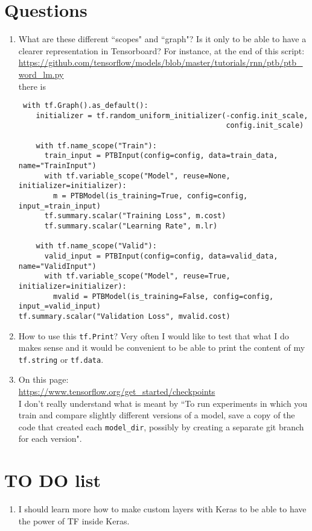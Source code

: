 \documentclass[11pt,a4paper]{article}
\begin{document}
\section{Questions}
\begin{enumerate}
\item What are these different ``scopes" and ``graph"? Is it only to be able to have a clearer representation in Tensorboard? For instance, at the end of this script:\\
\url{https://github.com/tensorflow/models/blob/master/tutorials/rnn/ptb/ptb_word_lm.py}\\
there is\\
\begin{verbatim}
 with tf.Graph().as_default():
    initializer = tf.random_uniform_initializer(-config.init_scale,
                                                config.init_scale)

    with tf.name_scope("Train"):
      train_input = PTBInput(config=config, data=train_data, name="TrainInput")
      with tf.variable_scope("Model", reuse=None, initializer=initializer):
        m = PTBModel(is_training=True, config=config, input_=train_input)
      tf.summary.scalar("Training Loss", m.cost)
      tf.summary.scalar("Learning Rate", m.lr)

    with tf.name_scope("Valid"):
      valid_input = PTBInput(config=config, data=valid_data, name="ValidInput")
      with tf.variable_scope("Model", reuse=True, initializer=initializer):
        mvalid = PTBModel(is_training=False, config=config, input_=valid_input)
tf.summary.scalar("Validation Loss", mvalid.cost)
\end{verbatim}
\item How to use this \texttt{tf.Print}? Very often I would like to test that what I do makes sense and it would be convenient to be able to print the content of my \texttt{tf.string} or \texttt{tf.data}.
\item On this page:\\
\url{https://www.tensorflow.org/get_started/checkpoints}\\
I don't really understand what is meant by ``To run experiments in which you train and compare slightly different versions of a model, save a copy of the code that created each \texttt{model\_dir}, possibly by creating a separate git branch for each version".
\end{enumerate}


\section{TO DO list}

\begin{enumerate}
\item I should learn more how to make custom layers with Keras to be able to have the power of TF inside Keras.
\end{enumerate}
\end{document}
